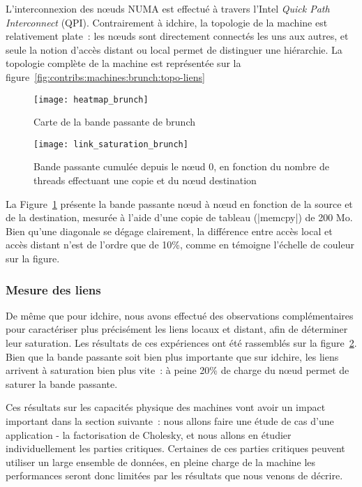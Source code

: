 L'interconnexion des nœuds NUMA est effectué à travers l'Intel \emph{Quick Path Interconnect} (QPI).
Contrairement à idchire, la topologie de la machine est relativement plate~: les nœuds sont directement connectés les uns aux autres, et seule la notion d'accès distant ou local permet de distinguer une hiérarchie.
La topologie complète de la machine est représentée sur la figure~\ref{fig:contribs:machines:brunch:topo-liens}

\begin{figure}[t!]
  \centering
  \texttt{[image: heatmap\_brunch]}
  \caption{Carte de la bande passante de brunch}\label{fig:contribs:machines:brunch:heatmap}
\end{figure}
\begin{figure}[h!]
  \centering
  \texttt{[image: link\_saturation\_brunch]}
  \caption{Bande passante cumulée depuis le nœud 0, en fonction du nombre de threads effectuant une copie et du nœud destination}\label{fig:contribs:machines:brunch:saturation}
\end{figure}


La Figure~\ref{fig:contribs:machines:brunch:heatmap} présente la bande passante nœud à nœud en fonction de la source et de la destination, mesurée à l'aide d'une copie de tableau (|memcpy|) de 200 Mo.
Bien qu'une diagonale se dégage clairement, la différence entre accès local et accès distant n'est de l'ordre que de 10\%, comme en témoigne l'échelle de couleur sur la figure.

\subsubsection{Mesure des liens}

De même que pour idchire, nous avons effectué des observations complémentaires pour caractériser plus précisément les liens locaux et distant, afin de déterminer leur saturation.
Les résultats de ces expériences ont été rassemblés sur la figure~\ref{fig:contribs:machines:brunch:saturation}.
Bien que la bande passante soit bien plus importante que sur idchire, les liens arrivent à saturation bien plus vite~: à peine 20\% de charge du nœud permet de saturer la bande passante.

\bigskip
\bigskip

Ces résultats sur les capacités physique des machines vont avoir un impact important dans la section suivante~: nous allons faire une étude de cas d'une application - la factorisation de Cholesky, et nous allons en étudier individuellement les parties critiques.
Certaines de ces parties critiques peuvent utiliser un large ensemble de données, en pleine charge de la machine les performances seront donc limitées par les résultats que nous venons de décrire.

